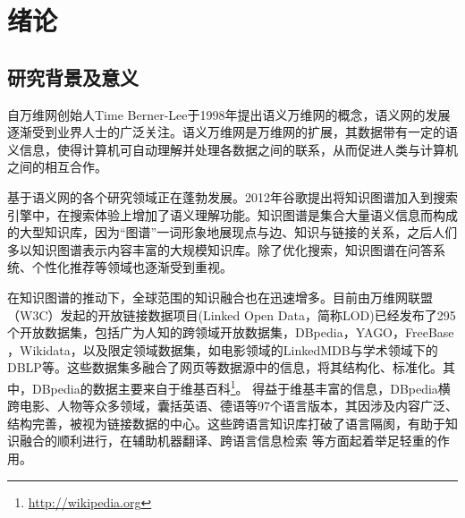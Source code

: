 \chapter{绪论}
\label{cha:intro}

\section{研究背景及意义}

自万维网创始人Time Berner-Lee于1998年提出语义万维网的概念，语义网的发展逐渐受到业界人士的广泛关注。语义万维网是万维网的扩展，其数据带有一定的语义信息，使得计算机可自动理解并处理各数据之间的联系，从而促进人类与计算机之间的相互合作。

基于语义网的各个研究领域正在蓬勃发展。2012年谷歌提出将知识图谱\cite{singhal2012introducing}加入到搜索引擎中，在搜索体验上增加了语义理解功能。知识图谱是集合大量语义信息而构成的大型知识库，因为“图谱”一词形象地展现点与边、知识与链接的关系，之后人们多以知识图谱表示内容丰富的大规模知识库。除了优化搜索，知识图谱在问答系统\cite{yih2015semantic,yang2014joint}、个性化推荐\cite{kaminskas2012knowledge}等领域也逐渐受到重视。

在知识图谱的推动下，全球范围的知识融合也在迅速增多。目前由万维网联盟（W3C）发起的开放链接数据项目(Linked Open Data，简称LOD)已经发布了295个开放数据集，包括广为人知的跨领域开放数据集，DBpedia\cite{auer2007dbpedia,bizer2009dbpedia,lehmann2015dbpedia}，YAGO\cite{suchanek2007yago,suchanek2008yago,hoffart2013yago2,mahdisoltani2014yago3}，FreeBase \cite{bollacker2008freebase}，Wikidata\cite{vrandevcic2014wikidata,erxleben2014introducing}，以及限定领域数据集，如电影领域的LinkedMDB与学术领域下的DBLP等。这些数据集多融合了网页等数据源中的信息，将其结构化、标准化。其中，DBpedia的数据主要来自于维基百科\footnote{\url{http://wikipedia.org}}。
得益于维基丰富的信息，DBpedia横跨电影、人物等众多领域，囊括英语、德语等97个语言版本，其因涉及内容广泛、结构完善，被视为链接数据的中心。这些跨语言知识库打破了语言隔阂，有助于知识融合的顺利进行，在辅助机器翻译\cite{niehues2011using}、跨语言信息检索\cite{giang2015building} 等方面起着举足轻重的作用。

